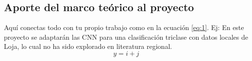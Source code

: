 \subsection{Aporte del marco teórico al proyecto}
Aquí conectas todo con tu propio trabajo como en la ecuación \ref{eq:1}. Ej: En este proyecto se adaptarán las CNN para una clasificación triclase con datos locales de Loja, lo cual no ha sido explorado en literatura regional.
\begin{equation}
\label{eq:1}
    y=i+j
\end{equation}
